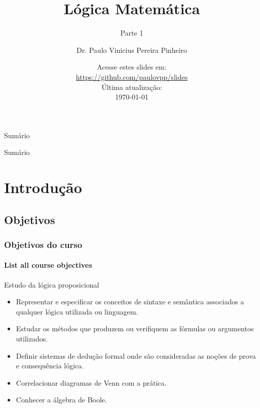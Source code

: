 \documentclass[10pt, headsepline, captions=tableabove,xcolor=table]{beamer}
\title{Lógica Matemática}
\subtitle{Parte 1}
\author[Paulo Pinheiro]
{Dr. Paulo Vinicius Pereira Pinheiro\inst{1}}
\institute[UNIFAP]
{
    \inst{1}
    Centro Universitário Paraíso do Ceará\\
    UNIFAP
}
\date{\small{Acesse estes slides em:\\ \url{https://github.com/paulovpp/slides}}\newline \\Última atualização:\\ \today}
\begin{document}
\begin{frame}
    \titlepage
\end{frame}

\logo{}

\begin{frame}[t]{Sumário}
    \tableofcontents[sections={1-3}]
\end{frame}
%
\begin{frame}[t]{Sumário}
    \tableofcontents[sections={4-}]
\end{frame}

\section{Introdução}
%
\subsection{Objetivos}
%
\begin{frame}[c]
    \frametitle{Objetivos do curso}
    \framesubtitle{List all course objectives}
    \begin{alertblock}{Estudo da lógica proposicional}
        \begin{itemize}
            \item Representar e especificar os conceitos de sintaxe e semântica associados a qualquer lógica utilizada ou linguagem.
            \item Estudar os métodos que produzem ou verifiquem as fórmulas ou argumentos utilizados.
            \item Definir sistemas de dedução formal onde são consideradas as noções de prova e consequência lógica.
            \item Correlacionar diagramas de Venn com a prática.
            \item Conhecer a álgebra de Boole.
        \end{itemize}
    \end{alertblock}
\end{frame}
%
\end{document}
